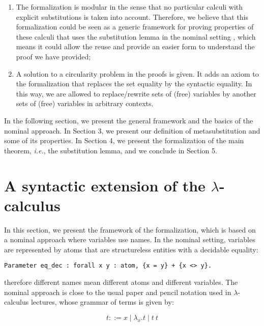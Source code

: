 \begin{enumerate}
\item The formalization is modular in the sense that no particular calculi with explicit substitutions is taken into account. Therefore, we believe that this formalization could be seen as a generic framework for proving properties of these calculi that uses the substitution lemma in the nominal setting \cite{kesnerPerpetualityFullSafe2008,nakazawaCompositionalConfluenceProofs2016,nakazawaPropertyShufflingCalculus2023}, which means it could allow the reuse and provide an easier form to understand the proof we have provided;
\item A solution to a circularity problem in the proofs is given. It adds an axiom to the formalization that replaces the set equality by the syntactic equality. In this way, we are allowed to replace/rewrite sets of (free) variables by another sets of (free) variables in arbitrary contexts.
\end{enumerate}


In the following section, we present the general framework and the basics of the nominal approach. In Section 3, we present our definition of metasubstitution and some of its properties. In Section 4, we present the formalization of the main theorem, {\it i.e.}, the substitution lemma, and we conclude in Section 5.

\section{A syntactic extension of the $\lambda$-calculus}



 In this section, we present the framework of the formalization, which is based on a nominal approach \cite{gabbayNewApproachAbstract1999} where variables use names. In the nominal setting, variables are represented by atoms that are structureless entities with a decidable equality: 


\begin{verbatim}
Parameter eq_dec : forall x y : atom, {x = y} + {x <> y}.
\end{verbatim}


\noindent therefore different names mean different atoms and different variables. The nominal approach is close to the usual paper and pencil notation used in $\lambda$-calculus lectures, whose grammar of terms is given by:


\begin{equation}\label{lambda:grammar}
 t ::= x \mid \lambda_x.t \mid t\ t
\end{equation}


